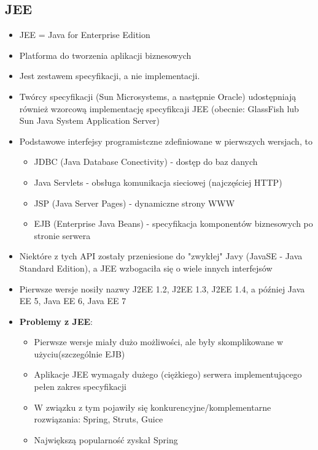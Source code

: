 \documentclass[../main.tex]{subfiles}
\begin{document}
    \subsection{JEE}
    \begin{itemize}
        \item JEE = Java for Enterprise Edition
        \item Platforma do tworzenia aplikacji biznesowych
        \item Jest zestawem specyfikacji, a nie implementacji.
        \item Twórcy specyfikacji (Sun Microsystems, a następnie Oracle) udostępniają również wzorcową implementację specyfikcaji JEE (obecnie: GlassFish lub Sun Java System Application Server)
        \item Podstawowe interfejsy programistczne zdefiniowane w pierwszych wersjach, to
        \begin{itemize}
            \item JDBC (Java Database Conectivity) - dostęp do baz danych
            \item Java Servlets - obsługa komunikacja sieciowej (najczęściej HTTP)
            \item JSP (Java Server Pages) - dynamiczne strony WWW
            \item EJB (Enterprise Java Beans) - specyfikacja komponentów biznesowych po
            stronie serwera
        \end{itemize}
        \item Niektóre z tych API zostały przeniesione do "zwykłej" Javy (JavaSE - Java Standard Edition), a JEE wzbogaciła się o wiele innych interfejsów
        \item Pierwsze wersje nosiły nazwy J2EE 1.2, J2EE 1.3, J2EE 1.4, a później Java
        EE 5, Java EE 6, Java EE 7
        \item \textbf{Problemy z JEE}:
        \begin{itemize}
            \item Pierwsze wersje miały dużo możliwości, ale były skomplikowane w użyciu(szczególnie EJB)
            \item Aplikacje JEE wymagały dużego (ciężkiego) serwera implementującego pełen zakres specyfikacji
            \item W związku z tym pojawiły się konkurencyjne/komplementarne rozwiązania: Spring, Struts, Guice
            \item Największą popularność zyskał Spring
        \end{itemize}
    \end{itemize}
\end{document}
